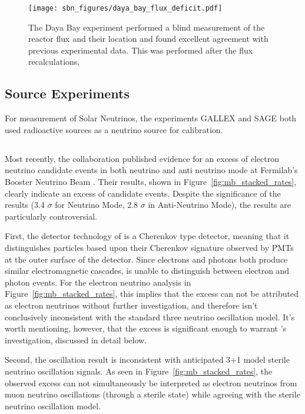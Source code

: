 \begin{figure}[tb]
  \centering
  \texttt{[image: sbn\_figures/daya\_bay\_flux\_deficit.pdf]}
  \caption[Daya Bay Reactor Flux]{The Daya Bay experiment performed a blind measurement of the reactor flux and their location and found excellent agreement with previous experimental data.  This was performed after the flux recalculations.}
  \label{fig:daya_bay_reactor_flux}
\end{figure}

\subsection{Source Experiments}

For measurement of Solar Neutrinos, the experiments GALLEX and SAGE both used radioactive sources as a neutrino source for calibration.

\cite{Abdurashitov:1998ne} \cite{Hampel:1997fc}

\subsection{\MB}

Most recently, the \MB collaboration published evidence for an excess of electron neutrino candidate events in both neutrino and anti neutrino mode at Fermilab's Booster Neutrino Beam \cite{Aguilar-Arevalo:2013pmq}.  Their results, shown in Figure~\ref{fig:mb_stacked_rates}, clearly indicate an excess of candidate events.  Despite the significance of the results (3.4 $\sigma$ for Neutrino Mode, 2.8 $\sigma$ in Anti-Neutrino Mode), the \MB results are particularly controversial.

First, the detector technology of \MB is a Cherenkov type detector, meaning that it distinguishes particles based upon their Cherenkov signature observed by PMTs at the outer surface of the detector.  Since electrons and photons both produce similar electromagnetic cascades, \MB is unable to distinguish between electron and photon events.  For the electron neutrino analysis in Figure~\ref{fig:mb_stacked_rates}, this implies that the excess can not be attributed as electron neutrinos without further investigation, and therefore isn't conclusively inconsistent with the standard three neutrino oscillation model.  It's worth mentioning, however, that the excess is significant enough to warrant \uboone's investigation, discussed in detail below.

Second, the \MB oscillation result is inconsistent with anticipated 3+1 model sterile neutrino oscillation signals.  As seen in Figure~\ref{fig:mb_stacked_rates}, the observed excess can not simultaneously be interpreted as electron neutrinos from muon neutrino oscillations (through a sterile state) while agreeing with the sterile neutrino oscillation model.

